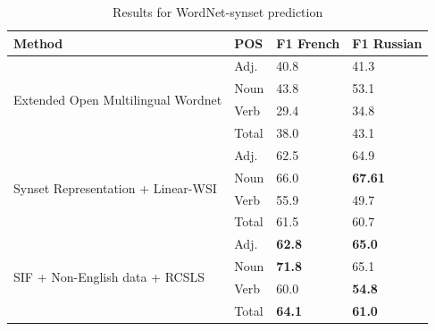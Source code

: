 \documentclass[conference]{IEEEtran}
\begin{document}
	\begin{table}[h]
		\small
		\caption{Results for WordNet-synset prediction}
		\label{wordnet-results}		
		\centering
		\begin{tabular}{l l l l}
			Method & POS & F1 French & F1 Russian
			\\
			\hline
			\multirow{4}{*}{Extended Open Multilingual Wordnet \cite{bond-wordnet}}
			& \multicolumn{1}{l}{Adj.} & \multicolumn{1}{l}{40.8} & \multicolumn{1}{l}{41.3} \\
			& \multicolumn{1}{l}{Noun} & \multicolumn{1}{l}{43.8} & \multicolumn{1}{l}{53.1} \\
			& \multicolumn{1}{l}{Verb} & \multicolumn{1}{l}{29.4} & \multicolumn{1}{l}{34.8} \\
			& \multicolumn{1}{l}{Total} & \multicolumn{1}{l}{38.0} & \multicolumn{1}{l}{43.1} \\
			\hline
			\multirow{4}{*}{Synset Representation + Linear-WSI \cite{Khodak2017}}
			& \multicolumn{1}{l}{Adj.} & \multicolumn{1}{l}{62.5} & \multicolumn{1}{l}{64.9} \\
			& \multicolumn{1}{l}{Noun} & \multicolumn{1}{l}{66.0} & \multicolumn{1}{l}{\textbf{67.61}} \\
			& \multicolumn{1}{l}{Verb} & \multicolumn{1}{l}{55.9} & \multicolumn{1}{l}{49.7} \\
			& \multicolumn{1}{l}{Total} & \multicolumn{1}{l}{61.5} & \multicolumn{1}{l}{60.7} \\
			\hline		
			\hline
			\multirow{4}{*}{SIF + Non-English data + RCSLS}
			& \multicolumn{1}{l}{Adj.} & \multicolumn{1}{l}{\textbf{62.8}} & \multicolumn{1}{l}{\textbf{65.0}} \\
			& \multicolumn{1}{l}{Noun} & \multicolumn{1}{l}{\textbf{71.8}} & \multicolumn{1}{l}{65.1} \\
			& \multicolumn{1}{l}{Verb} & \multicolumn{1}{l}{60.0} & \multicolumn{1}{l}{\textbf{54.8}} \\
			& \multicolumn{1}{l}{Total} & \multicolumn{1}{l}{\textbf{64.1}} & \multicolumn{1}{l}{\textbf{61.0}} \\
			

\end{tabular}
\end{table}
\end{document}
